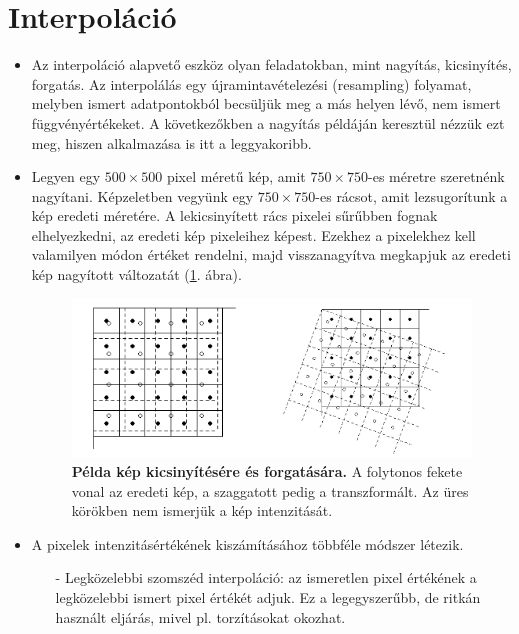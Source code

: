 \documentclass[12pt]{article}
\theoremstyle{plain}
\begin{document}
\section{Interpoláció}

\begin{itemize}
    

\item Az interpoláció alapvető eszköz olyan feladatokban, mint nagyítás, kicsinyítés, forgatás. Az interpolálás egy újramintavételezési (resampling) folyamat, melyben ismert adatpontokból becsüljük meg a más helyen lévő, nem ismert függvényértékeket. A következőkben a nagyítás példáján keresztül nézzük ezt meg, hiszen alkalmazása is itt a leggyakoribb.

\item Legyen egy $500 \times 500$ pixel méretű kép, amit $750 \times 750$-es méretre szeretnénk nagyítani. Képzeletben vegyünk egy $750 \times 750$-es rácsot, amit lezsugorítunk a kép eredeti méretére. A lekicsinyített rács pixelei sűrűbben fognak elhelyezkedni, az eredeti kép pixeleihez képest. Ezekhez a pixelekhez kell valamilyen módon értéket rendelni, majd visszanagyítva megkapjuk az eredeti kép nagyított változatát (\ref{fig:int}. ábra). 

\begin{figure}[H]
    \begin{center}
    \includegraphics[width=0.75\linewidth]{media/interpol.png}
    \caption{\textbf{Példa kép kicsinyítésére és forgatására.} A folytonos fekete vonal az eredeti kép, a szaggatott pedig a transzformált. Az üres körökben nem ismerjük a kép intenzitását.} 
    \label{fig:int}
    \end{center}
\end{figure}


\item A pixelek intenzitásértékének kiszámításához többféle módszer létezik.
\begin{itemize}

\item[-] Legközelebbi szomszéd interpoláció: az ismeretlen pixel értékének a legközelebbi ismert pixel értékét adjuk. Ez a legegyszerűbb, de ritkán használt eljárás, mivel pl. torzításokat okozhat.


\end{itemize}
\end{itemize}
\end{document}
